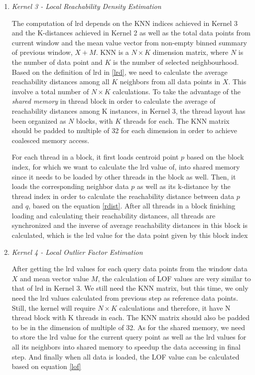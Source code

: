 \documentclass[11pt]{article}       %
\begin{document}
\begin{enumerate}
	\item {\textit{Kernel 3 - Local Reachability Density Estimation}}
	
	The computation of lrd depends on the KNN indices achieved in Kernel 3 and the K-distances achieved in Kernel 2 as well as the total data points from current window and the mean value vector from non-empty binned summary of previous window, $X + M$. KNN is a $N \times K$ dimension matrix, where $N$ is the number of data point and $K$ is the number of selected neighbourhood. Based on the definition of lrd in \ref{lrd}, we need to calculate the average reachability distances among all $K$ neighbors from all data points in $X$. This involve a total number of $N \times K$ calculations. To take the advantage of the \textit{shared memory} in thread block in order to calculate the average of reachability distances among K instances, in Kernel 3, the thread layout has been organized as $N$ blocks, with $K$ threads for each. The KNN matrix should be padded to multiple of 32 for each dimension in order to achieve coalesced memory access. 
	
	For each thread in a block, it first loads centroid point $p$ based on the block index, for which we want to calculate the lrd value of, into shared memory since it needs to be loaded by other threads in the block as well. Then, it loads the corresponding neighbor data $p$ as well as its k-distance by the thread index in order to calculate the reachability distance between data $p$ and $q$, based on the equation \ref{rdist}. After all threads in a block finishing loading and calculating their reachability distances, all threads are synchronized and the inverse of average reachability distances in this block is calculated, which is the lrd value for the data point given by this block index
			
	\item {\textit{Kernel 4 - Local Outlier Factor Estimation}}
	
	After getting the lrd values for each query data points from the window data $X$ and mean vector value $M$, the calculation of LOF values are very similar to that of lrd in Kernel 3. We still need the KNN matrix, but this time, we only need the lrd values calculated from previous step as reference data points. Still, the kernel will require $N \times K$ calculations and therefore, it have N thread block with K threads in each. The KNN matrix should also be padded to be in the dimension of multiple of 32. As for the shared memory, we need to store the lrd value for the current query point as well as the lrd values for all its neighbors into shared memory to speedup the data accessing in final step. And finally when all data is loaded, the LOF value can be calculated based on equation \ref{lof}

\end{enumerate}
\end{document}
